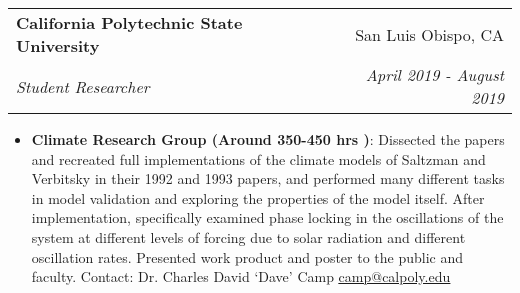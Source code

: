 \documentclass[letterpaper,10pt]{article}
\makeatletter
\newcommand{\resumeItem}[2]{
  \item\small{
    \textbf{#1}{: #2 \vspace{-2pt}}
  }
}
\newcommand{\resumeSubheading}[4]{
  \vspace{-1pt}\item[]
  \begin{tabular*}{0.98\textwidth}{l@{\extracolsep{\fill}}r}
      \hspace{-10pt}\textbf{#1} & #2 \\
      \hspace{-10pt}\textit{\small#3} & \textit{\small #4} \\
    \end{tabular*}\vspace{-5pt}
}
\newcommand{\resumeItemListStart}{\begin{itemize}}
\newcommand{\resumeItemListEnd}{\end{itemize}\vspace{-5pt}}
\makeatother
\begin{document}
    \resumeSubheading
      {California Polytechnic State University}{San Luis Obispo, CA}
      {Student Researcher}{April 2019 - August 2019}
      \resumeItemListStart
       \resumeItem{Climate Research Group (Around 350-450 hrs )}
          {Dissected the papers and recreated full implementations of the climate models of Saltzman and Verbitsky in their 1992 and 1993 papers, and performed many different tasks in model validation and exploring the properties of the model itself. After implementation, specifically examined phase locking in the oscillations of the system at different levels of forcing due to solar radiation and different oscillation rates. Presented work product and poster to the public and faculty. Contact: Dr. Charles David `Dave' Camp \href{mailto:camp@calpoly.edu}{\color{blue}\underline{camp@calpoly.edu}}}
      \resumeItemListEnd
\end{document}
